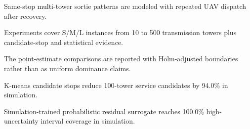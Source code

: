 \begin{highlights}
\item Same-stop multi-tower sortie patterns are modeled with repeated UAV dispatch after recovery.
\item Experiments cover S/M/L instances from 10 to 500 transmission towers plus candidate-stop and statistical evidence.
\item The point-estimate comparisons are reported with Holm-adjusted boundaries rather than as uniform dominance claims.
\item K-means candidate stops reduce 100-tower service candidates by 94.0\% in simulation.
\item Simulation-trained probabilistic residual surrogate reaches 100.0\% high-uncertainty interval coverage in simulation.
\end{highlights}
